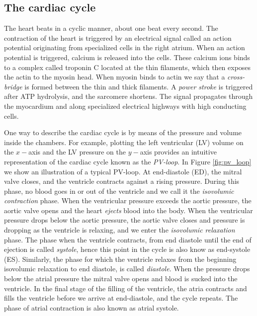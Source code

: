 \subsection{The cardiac cycle}
\label{sec:cardiac_cycle}

The heart beats in a cyclic manner, about one beat every second.
The contraction of the heart is triggered by an electrical signal called an action
potential originating from specialized cells in the right atrium. When an action
potential is triggered, calcium is released into the cells. These
calcium ions binds to a complex called troponin C located at the thin
filaments, which then exposes the actin to the myosin head. When
myosin binds to actin we say that a \emph{cross-bridge} is formed
between the thin and thick filaments. A \emph{power stroke} is
triggered after ATP hydrolysis, and the sarcomere shortens. 
The signal propagates through the myocardium and along
specialized electrical highways with high conducting cells.

One way to describe the cardiac cycle is by means of
the pressure and volume inside the chambers. For example, plotting
the left ventricular (LV) volume on the $x-$axis and the LV pressure on the $y-$axis
provides an intuitive representation of the cardiac cycle known as the
\emph{PV-loop}. In Figure \ref{fig:pv_loop} we show an illustration of
a typical PV-loop. At end-diastole (ED), the mitral valve closes, and
the ventricle contracts against a rising pressure. During this phase,
no blood goes in or out of the ventricle and we call it the
\emph{isovolumic contraction} phase. When the
ventricular pressure exceeds the aortic pressure, the aortic valve
opens and the heart \emph{ejects} blood into the body. When the ventricular
pressure drops below the aortic pressure, the aortic valve closes and
pressure is dropping as the ventricle is relaxing, and we enter the
\emph{isovolumic relaxation} phase. The phase when the ventricle
contracts, from end diastole until the end of ejection is called
\emph{systole}, hence this point in the cycle is also know as
end-systole (ES). Similarly, the phase for which the ventricle
relaxes from the beginning isovolumic relaxation to end diastole, is
called \emph{diastole}. When the pressure drops below the atrial pressure 
the mitral valve opens and blood is sucked into the ventricle. In the
final stage of the filling of the ventricle, the atria contracts and
fills the ventricle before we arrive at end-diastole, and the cycle
repeats. The phase of atrial contraction is also known as atrial
systole. 



